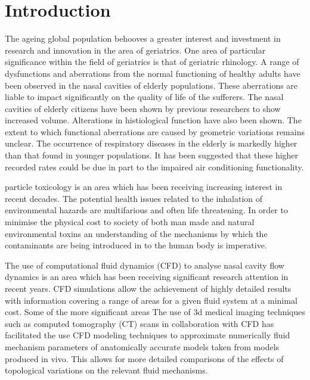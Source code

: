 \documentclass{article}
\begin{document}
\section{Introduction}

The ageing global population behooves a greater interest and investment in research and innovation in the area of geriatrics. One area of particular significance within the field of geriatrics is that of geriatric rhinology. A range of dysfunctions and aberrations from the normal functioning of healthy adults have been observed in the nasal cavities of elderly populations\cite{Edelstein1996, Lindemann2008}. These aberrations are liable to impact significantly on the quality of life of the sufferers. The nasal cavities of elderly citizens have been shown by previous researchers to show increased volume\cite{Kalmovich2005}. Alterations in histiological function have also been shown\cite{HO2001}. The extent to which functional aberrations are caused by geometric variations remains unclear\cite{Varga-Huettner2013}. The occurrence of respiratory diseases in the elderly is markedly higher than that found in younger populations\cite{HO2001, Edelstein1996}. It has been suggested that these higher recorded rates could be due in part to the impaired air conditioning functionality\cite{Lindemann2008}.

particle toxicology is an area which has been receiving increasing interest in recent decades. The potential health issues related to the inhalation of environmental hazards are multifarious and often life threatening. In order to minimise the physical cost to society of both man made and natural environmental toxins an understanding of the mechanisms by which the contaminants are being introduced in to the human body is imperative.

The use of computational fluid dynamics (CFD) to analyse nasal cavity flow dynamics is an area which has been receiving significant research attention in recent years. CFD simulations allow the achievement of highly detailed results with information covering a range of areas for a given fluid system at a minimal cost. Some of the more significant areas The use of 3d medical imaging techniques such as computed tomography (CT) scans in collaboration with CFD has facilitated the use CFD modeling techniques to approximate numerically fluid mechanism parameters of anatomically accurate models taken from models produced in vivo. This allows for more detailed comparisons of the effects of topological variations on the relevant fluid mechanisms.
\end{document}

